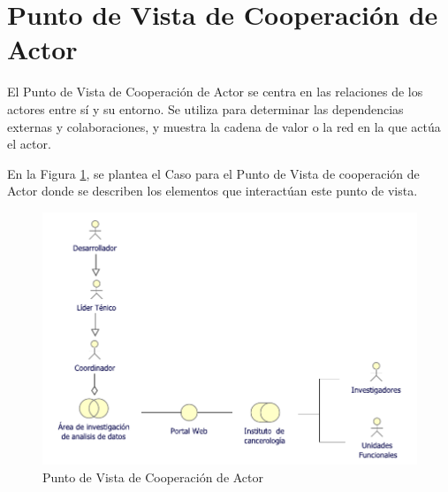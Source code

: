 \newpage
\section{Punto de Vista de Cooperación de Actor}
El Punto de Vista de Cooperación de Actor se centra en las relaciones de los actores entre sí y su entorno. Se utiliza para determinar las dependencias externas y colaboraciones, y muestra la cadena de valor o la red en la que actúa el actor\cite{BolanosCastro2019}.

En la Figura \ref{PvCooperacionActor}, se plantea el Caso para el Punto de Vista de cooperación de Actor donde se describen los elementos que interactúan este punto de vista.

\begin{figure}[h!]
	\centering
	\includegraphics[width=1\linewidth]{ARQUITECTURA/imgs/CapaNegocio/2_PvCooperacionActor}
	\caption{Punto de Vista de Cooperación de Actor}
	\label{PvCooperacionActor}
\end{figure}

